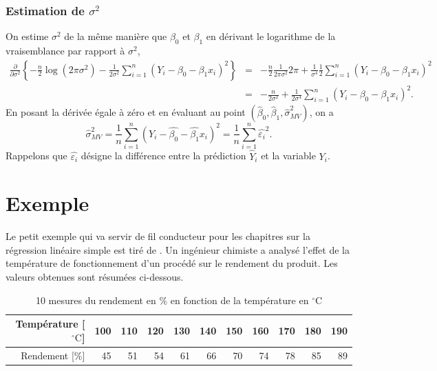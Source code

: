 \subsubsection{Estimation de $\sigma^2$}

On estime $\sigma^2$ de la même manière que $\beta_0$ et $\beta_1$ en dérivant le logarithme de la vraisemblance par rapport à $\sigma^2$,
 \begin{eqnarray*}
 \frac{\partial}{\partial \sigma^2}\left\{ -\frac{n}{2} \log (2\pi\sigma^2)-\frac{1}{2 \sigma^2}\sum_{i=1}^n (Y_i - \beta_0 - \beta_1 x_i)^2\right\}
 & = & -\frac{n}{2} \frac{1}{2\pi\sigma^2} 2\pi + \frac{1}{\sigma^4} \frac{1}{2}\sum_{i=1}^n(Y_i-\beta_0-\beta_1 x_i)^2 \\
 & = & -\frac{n}{2\sigma^2}+ \frac{1}{2 \sigma^4}\sum_{i=1}^n(Y_i-\beta_0-\beta_1 x_i)^2.
\end{eqnarray*}
En posant la dérivée égale à zéro et en évaluant au point $\left(\widehat\beta_0, \widehat\beta_1, \widehat\sigma_{MV}^2 \right)$, on a 
\begin{equation}
 \widehat{\sigma}^2_{MV} = \frac{1}{n}\sum_{i=1}^n(Y_i - \widehat{\beta_0} - \widehat{\beta_1}x_i)^2 = \frac{1}{n}\sum_{i=1}^n \widehat{\varepsilon_i}^2.
 \label{sigma2}
\end{equation}
Rappelons que $\widehat{\varepsilon_i}$ désigne la différence entre la prédiction $\widehat{Y}_i$ et la variable $Y_i$.

\section{Exemple}
\label{exemple-RLS-interpretation}

Le petit exemple qui va servir de fil conducteur pour les chapitres sur la régression linéaire simple est tiré de \citet{Hin_Mon_Gol_Bor:12}. %
Un ingénieur chimiste a analysé l'effet de la température de fonctionnement d'un procédé sur le rendement du produit. Les valeurs obtenues sont résumées ci-dessous.

\begin{table}[!ht]
\caption{10 mesures du rendement en $\%$ en fonction de la température en $^{\circ}\mathrm{C}$ } \label{tab:donnees_exp}
\label{exp:donnees}
\begin{tabular}{r|rrrrrrrrrr}
Température [$^{\circ}\mathrm{C}$] & 100 & 110 & 120 & 130 & 140 & 150 & 160 & 170 & 180 & 190 \\ \hline
Rendement [$\%$] & 45 & 51 & 54 & 61 & 66 & 70 & 74 & 78 & 85 & 89
\end{tabular}
\end{table}

